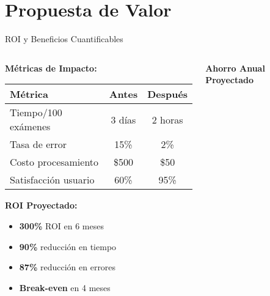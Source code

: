 \documentclass[aspectratio=169,11pt]{beamer}
\begin{document}
\section{Propuesta de Valor}

\begin{frame}{ROI y Beneficios Cuantificables}
    \begin{columns}
        \begin{column}{0.5\textwidth}
            \textbf{\textcolor{jazzblue}{Métricas de Impacto:}}
            \begin{table}[h]
                \small
                \begin{tabular}{lcc}
                    \toprule
                    \textbf{Métrica} & \textbf{Antes} & \textbf{Después} \\
                    \midrule
                    Tiempo/100 exámenes & 3 días & 2 horas \\
                    Tasa de error & 15\% & 2\% \\
                    Costo procesamiento & \$500 & \$50 \\
                    Satisfacción usuario & 60\% & 95\% \\
                    \bottomrule
                \end{tabular}
            \end{table}
            
            \vspace{0.3cm}
            \textbf{\textcolor{jazzgreen}{ROI Proyectado:}}
            \begin{itemize}
                \item \textbf{300\%} ROI en 6 meses
                \item \textbf{90\%} reducción en tiempo
                \item \textbf{87\%} reducción en errores
                \item \textbf{Break-even} en 4 meses
            \end{itemize}
        \end{column}
        \begin{column}{0.5\textwidth}
            \begin{center}
                \textbf{Ahorro Anual Proyectado}
                \vspace{0.3cm}
                
\end{center}
\end{column}
\end{columns}
\end{frame}
\end{document}
